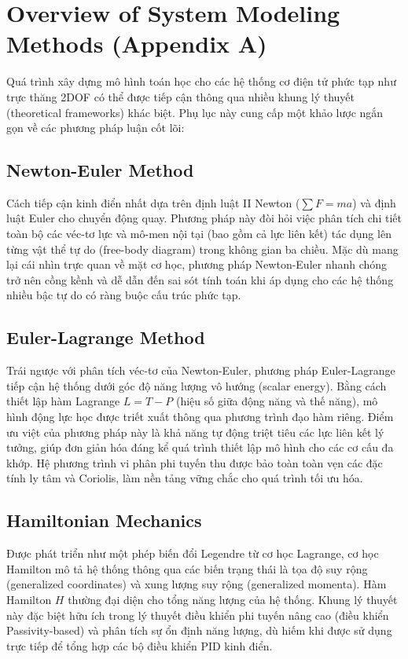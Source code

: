 \documentclass[conference, a4paper]{IEEEtran}
\begin{document}
\nocite{*}



\appendices
\section{Overview of System Modeling Methods (Appendix A)}
Quá trình xây dựng mô hình toán học cho các hệ thống cơ điện tử phức tạp như trực thăng 2DOF có thể được tiếp cận thông qua nhiều khung lý thuyết (theoretical frameworks) khác biệt. Phụ lục này cung cấp một khảo lược ngắn gọn về các phương pháp luận cốt lõi:

\subsection{Newton-Euler Method}
Cách tiếp cận kinh điển nhất dựa trên định luật II Newton ($\sum F = ma$) và định luật Euler cho chuyển động quay. Phương pháp này đòi hỏi việc phân tích chi tiết toàn bộ các véc-tơ lực và mô-men nội tại (bao gồm cả lực liên kết) tác dụng lên từng vật thể tự do (free-body diagram) trong không gian ba chiều. Mặc dù mang lại cái nhìn trực quan về mặt cơ học, phương pháp Newton-Euler nhanh chóng trở nên cồng kềnh và dễ dẫn đến sai sót tính toán khi áp dụng cho các hệ thống nhiều bậc tự do có ràng buộc cấu trúc phức tạp.

\subsection{Euler-Lagrange Method}
Trái ngược với phân tích véc-tơ của Newton-Euler, phương pháp Euler-Lagrange tiếp cận hệ thống dưới góc độ năng lượng vô hướng (scalar energy). Bằng cách thiết lập hàm Lagrange $L = T - P$ (hiệu số giữa động năng và thế năng), mô hình động lực học được triết xuất thông qua phương trình đạo hàm riêng. Điểm ưu việt của phương pháp này là khả năng tự động triệt tiêu các lực liên kết lý tưởng, giúp đơn giản hóa đáng kể quá trình thiết lập mô hình cho các cơ cấu đa khớp. Hệ phương trình vi phân phi tuyến thu được bảo toàn toàn vẹn các đặc tính ly tâm và Coriolis, làm nền tảng vững chắc cho quá trình tối ưu hóa.

\subsection{Hamiltonian Mechanics}
Được phát triển như một phép biến đổi Legendre từ cơ học Lagrange, cơ học Hamilton mô tả hệ thống thông qua các biến trạng thái là tọa độ suy rộng (generalized coordinates) và xung lượng suy rộng (generalized momenta). Hàm Hamilton $H$ thường đại diện cho tổng năng lượng của hệ thống. Khung lý thuyết này đặc biệt hữu ích trong lý thuyết điều khiển phi tuyến nâng cao (điều khiển Passivity-based) và phân tích sự ổn định năng lượng, dù hiếm khi được sử dụng trực tiếp để tổng hợp các bộ điều khiển PID kinh điển.
\end{document}
